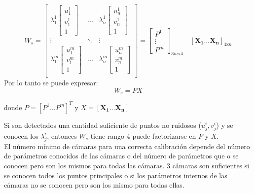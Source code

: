 \[
W_s =
\begin{bmatrix}

	\lambda_1^1
	\begin{bmatrix}
	u_1^1 \\
	v_1^1 \\
	1
	\end{bmatrix} &
	
	\ldots &
	
	\lambda_n^1
	\begin{bmatrix}
	u_n^1 \\
	v_n^1 \\
	1
	\end{bmatrix} \\
	
	\vdots & \ddots & \vdots \\
	
	
	\lambda_1^m
	\begin{bmatrix}
	u_1^m \\
	v_1^m \\
	1
	\end{bmatrix} &
	
	\ldots &
	
	\lambda_n^m
	\begin{bmatrix}
	u_n^m \\
	v_n^m \\
	1
	\end{bmatrix} \\

\end{bmatrix}
= 
\begin{bmatrix}
P^1 \\
\vdots \\
P^m
\end{bmatrix}_{3m\text{x}4}
\quad
[\mathbf{X_1} \ldots \mathbf{X_n}]_{4\text{x}n}
\]
Por lo tanto se puede expresar:
\[ W_s = PX\]

donde $P = [P^1 \ldots P^m]^T$ y $X = [\mathbf{X_1} \ldots \mathbf{X_n}]$

Si son detectados una cantidad suficiente de puntos no ruidosos ($u_j^i, v_j^i$) y se conocen los $\lambda_j^i$, entonces $W_s$ tiene rango 4 puede factorizarse en $P$ y $X$.\\

El número mínimo de cámaras para una correcta calibración depende del número de parámetros conocidos de las cámaras o del número de parámetros que o se conocen pero son los mismos para todas las cámaras. 3 cámaras son suficientes si se conocen todos los puntos principales o si los parámetros internos de las cámaras no se conocen pero son los mismo para todas ellas.\\

